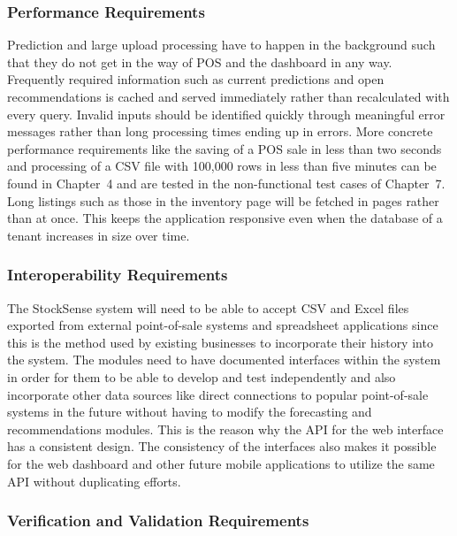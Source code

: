 \documentclass{StockSense}
\begin{document}
\subsubsection{Performance Requirements}

Prediction and large upload processing have to happen in the background such that they do not get in the way of POS and the dashboard in any way. Frequently required information such as current predictions and open recommendations is cached and served immediately rather than recalculated with every query. Invalid inputs should be identified quickly through meaningful error messages rather than long processing times ending up in errors. More concrete performance requirements like the saving of a POS sale in less than two seconds and processing of a CSV file with 100,000 rows in less than five minutes can be found in Chapter~4 and are tested in the non-functional test cases of Chapter~7. Long listings such as those in the inventory page will be fetched in pages rather than at once. This keeps the application responsive even when the database of a tenant increases in size over time.

\subsubsection{Interoperability Requirements}

The StockSense system will need to be able to accept CSV and Excel files exported from external point-of-sale systems and spreadsheet applications since this is the method used by existing businesses to incorporate their history into the system. The modules need to have documented interfaces within the system in order for them to be able to develop and test independently and also incorporate other data sources like direct connections to popular point-of-sale systems in the future without having to modify the forecasting and recommendations modules. This is the reason why the API for the web interface has a consistent design. The consistency of the interfaces also makes it possible for the web dashboard and other future mobile applications to utilize the same API without duplicating efforts.

\subsubsection{Verification and Validation Requirements}
\end{document}
